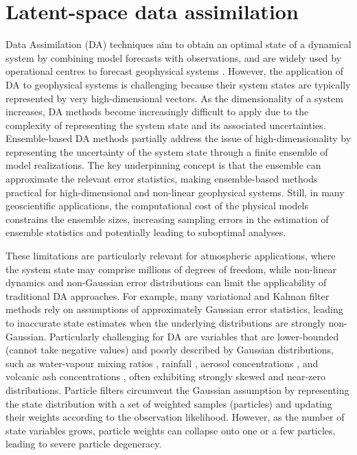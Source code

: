 \section{Latent-space data assimilation} 
\label{sec:da}
%
Data Assimilation (DA) techniques aim to obtain an optimal state of a dynamical system by combining model forecasts with observations, and are widely used by operational centres to forecast geophysical systems \citep{carrasi2018}. However, the application of DA to geophysical systems is challenging because their system states are typically represented by very high-dimensional vectors. As the dimensionality of a system increases, DA methods become increasingly difficult to apply due to the complexity of representing the system state and its associated uncertainties.
%
Ensemble-based DA methods partially address the issue of high-dimensionality by representing the uncertainty of the system state through a finite ensemble of model realizations. The key underpinning concept is that the ensemble can approximate the relevant error statistics, making ensemble-based methods practical for high-dimensional and non-linear geophysical systems. Still, in many geoscientific applications, the computational cost of the physical models constrains the ensemble sizes, increasing sampling errors in the estimation of ensemble statistics and potentially leading to suboptimal analyses.

These limitations are particularly relevant for atmospheric applications, where the system state may comprise millions of degrees of freedom, while non-linear dynamics and non-Gaussian error distributions can limit the applicability of traditional DA approaches. For example, many variational and Kalman filter methods rely on assumptions of approximately Gaussian error statistics, leading to inaccurate state estimates when the underlying distributions are strongly non-Gaussian.
%
Particularly challenging for DA are variables that are lower-bounded (\eg cannot take negative values) and poorly described by Gaussian distributions, such as water-vapour mixing ratios \citep{kliewer2016}, rainfall \citep{husak2007}, aerosol concentrations \citep{oneill2000}, and volcanic ash concentrations \citep{mingari2023}, often exhibiting strongly skewed and near-zero distributions.
%
Particle filters circumvent the Gaussian assumption by representing the state distribution with a set of weighted samples (particles) and updating their weights according to the observation likelihood. However, as the number of state variables grows, particle weights can collapse onto one or a few particles, leading to severe particle degeneracy.

